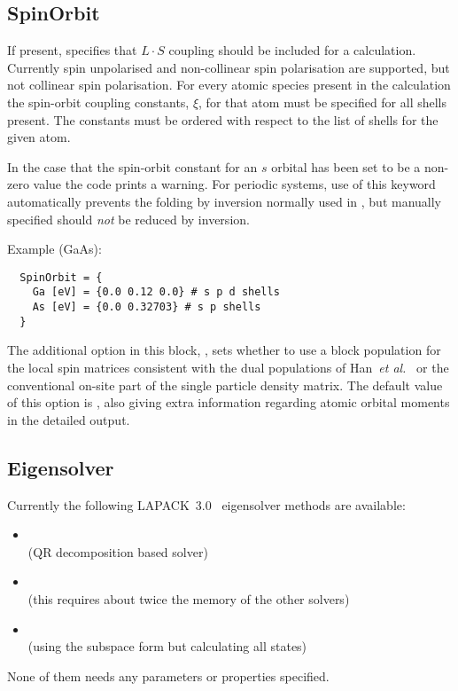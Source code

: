 \subsection{SpinOrbit}
\label{sec:dftbp.SpinOrbit}

If present, specifies that $L \cdot S$ coupling should be included for
a calculation. Currently spin unpolarised and non-collinear spin
polarisation are supported, but not collinear spin polarisation. For
every atomic species present in the calculation the spin-orbit
coupling constants, $\xi$, for that atom must be specified for all
shells present.  The constants must be ordered with respect to the
list of shells for the given atom.

In the case that the spin-orbit constant for an $s$ orbital has been
set to be a non-zero value the code prints a warning. For periodic
systems, use of this keyword automatically prevents the folding by
inversion normally used in , but manually
specified  should {\em not} be reduced by
inversion.

Example (GaAs):
\begin{verbatim}
  SpinOrbit = {
    Ga [eV] = {0.0 0.12 0.0} # s p d shells
    As [eV] = {0.0 0.32703} # s p shells
  }
\end{verbatim}

The additional option in this block, , sets whether to use a block
population for the local spin matrices consistent with the dual populations of
Han~{\it et al.}~\cite{han-PRB-73-045110} or the conventional on-site part of
the single particle density matrix. The default value of this option is
, also giving extra information regarding atomic orbital moments in the
detailed output.

\subsection{Eigensolver}
\label{sec:dftbp.Eigensolver}

Currently the following LAPACK~3.0~\cite{lapack3} eigensolver methods
are available:
\begin{itemize}
\item {}\\ (QR decomposition based solver)
\item {}\\ (this requires about twice the memory
  of the other solvers)
\item {}\\ (using the subspace form but
  calculating all states)
\end{itemize}
None of them needs any parameters or properties specified.


